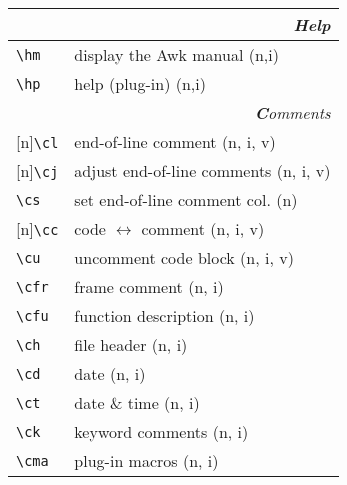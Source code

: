 \documentclass[oneside,10pt,landscape,DIV16]{scrartcl}
\newcommand{\Rep}{{\scriptsize{[n]}}}
\begin{document}
\begin{multicols}{3}
\begin{center}
\begin{tabular}[]{|p{11mm}|p{60mm}|}
\hline 
\multicolumn{2}{|r|}{\textsl{\textbf{H}elp}}\\[1.0ex]
\hline \verb'\hm'   & display the Awk manual                 \hfill (n,i)\\
\hline \verb'\hp'   & help (plug-in)                         \hfill (n,i)\\
\hline 
\hline
\multicolumn{2}{|r|}{\textsl{\textbf{C}omments}}                       \\[1.0ex]
\hline \Rep\verb'\cl'   & end-of-line comment               \hfill (n, i, v)\\
\hline \Rep\verb'\cj'   & adjust end-of-line comments       \hfill (n, i, v)\\
\hline     \verb'\cs'   & set end-of-line comment col.      \hfill (n)      \\
%
\hline \Rep\verb'\cc'   & code $\leftrightarrow$ comment    \hfill (n, i, v)\\
\hline     \verb'\cu'   & uncomment code block              \hfill (n, i, v)\\
%
\hline     \verb'\cfr'  & frame comment                     \hfill (n, i)   \\
\hline     \verb'\cfu'  & function description              \hfill (n, i)   \\
\hline     \verb'\ch'   & file header                       \hfill (n, i)   \\
\hline     \verb'\cd'   & date                              \hfill (n, i)   \\
\hline     \verb'\ct'   & date \& time                      \hfill (n, i)   \\
\hline     \verb'\ck'   & keyword comments                  \hfill (n, i)   \\
\hline     \verb'\cma'  & plug-in macros                    \hfill (n, i)   \\
\hline
\end{tabular}\\

\end{center}
\end{multicols}
\end{document}
